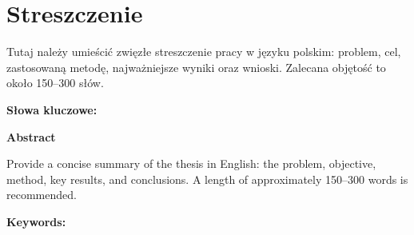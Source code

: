 \chapter*{Streszczenie}
Tutaj należy umieścić zwięzłe streszczenie pracy w języku polskim: problem, cel, zastosowaną metodę, najważniejsze wyniki oraz wnioski. Zalecana objętość to około 150--300 słów.

\noindent\textbf{Słowa kluczowe:} \keywordspl
\par\vspace{18pt}
\begin{otherlanguage}{english}
{\noindent\bfseries\fontsize{16}{19}\selectfont Abstract\par}
\vspace{12pt}
Provide a concise summary of the thesis in English: the problem, objective, method, key results, and conclusions. A length of approximately 150--300 words is recommended.

\noindent\textbf{Keywords:} \keywordsen
\end{otherlanguage}
